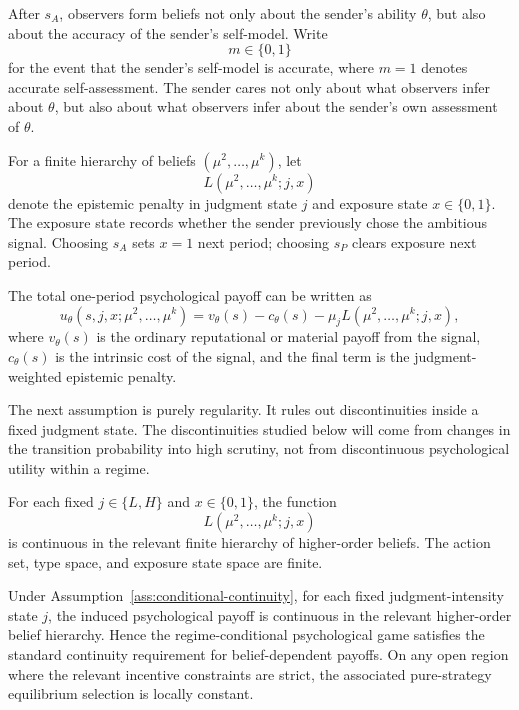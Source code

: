 After $s_A$, observers form beliefs not only about the sender's ability $\theta$, but also about the accuracy of the sender's self-model. Write
\[
m\in\{0,1\}
\]
for the event that the sender's self-model is accurate, where $m=1$ denotes accurate self-assessment. The sender cares not only about what observers infer about $\theta$, but also about what observers infer about the sender's own assessment of $\theta$.

For a finite hierarchy of beliefs $(\mu^2,\ldots,\mu^k)$, let
\[
L(\mu^2,\ldots,\mu^k;j,x)
\]
denote the epistemic penalty in judgment state $j$ and exposure state $x\in\{0,1\}$. The exposure state records whether the sender previously chose the ambitious signal. Choosing $s_A$ sets $x=1$ next period; choosing $s_P$ clears exposure next period.

The total one-period psychological payoff can be written as
\[
u_\theta(s,j,x;\mu^2,\ldots,\mu^k)
=
v_\theta(s)-c_\theta(s)-\mu_j L(\mu^2,\ldots,\mu^k;j,x),
\]
where $v_\theta(s)$ is the ordinary reputational or material payoff from the signal, $c_\theta(s)$ is the intrinsic cost of the signal, and the final term is the judgment-weighted epistemic penalty.

The next assumption is purely regularity. It rules out discontinuities inside a fixed judgment state. The discontinuities studied below will come from changes in the transition probability into high scrutiny, not from discontinuous psychological utility within a regime.

\begin{assumption}
\label{ass:conditional-continuity}
For each fixed $j\in\{L,H\}$ and $x\in\{0,1\}$, the function
\[
L(\mu^2,\ldots,\mu^k;j,x)
\]
is continuous in the relevant finite hierarchy of higher-order beliefs. The action set, type space, and exposure state space are finite.
\end{assumption}

\begin{lemma}
\label{lem:regime-continuity}
Under Assumption~\ref{ass:conditional-continuity}, for each fixed judgment-intensity state $j$, the induced psychological payoff is continuous in the relevant higher-order belief hierarchy. Hence the regime-conditional psychological game satisfies the standard continuity requirement for belief-dependent payoffs. On any open region where the relevant incentive constraints are strict, the associated pure-strategy equilibrium selection is locally constant.
\end{lemma}

